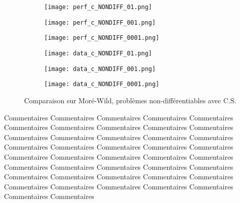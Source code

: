 \documentclass[letterpaper]{scrartcl}
\begin{document}
		\begin{figure}[!htb] %
			\begin{subfigure}{0.48\textwidth}
				\texttt{[image: perf\_c\_NONDIFF\_01.png]}
			\end{subfigure}\hspace*{\fill}
			\begin{subfigure}{0.48\textwidth}
				\texttt{[image: perf\_c\_NONDIFF\_001.png]}
			\end{subfigure}
			\medskip
			\begin{subfigure}{0.48\textwidth}
				\texttt{[image: perf\_c\_NONDIFF\_0001.png]}
			\end{subfigure}\hspace*{\fill}
			\begin{subfigure}{0.48\textwidth}
				\texttt{[image: data\_c\_NONDIFF\_01.png]}
			\end{subfigure}
			\medskip
			\begin{subfigure}{0.48\textwidth}
				\texttt{[image: data\_c\_NONDIFF\_001.png]}
			\end{subfigure}\hspace*{\fill}
			\begin{subfigure}{0.48\textwidth}
				\texttt{[image: data\_c\_NONDIFF\_0001.png]}
			\end{subfigure}
			\caption{Comparaison sur Moré-Wild, problèmes non-différentiables avec C.S.} \label{fig:2}
		\end{figure}
		\clearpage
		Commentaires Commentaires Commentaires Commentaires Commentaires Commentaires Commentaires Commentaires Commentaires Commentaires Commentaires Commentaires Commentaires Commentaires Commentaires Commentaires Commentaires Commentaires Commentaires Commentaires Commentaires Commentaires Commentaires Commentaires Commentaires Commentaires Commentaires Commentaires Commentaires Commentaires Commentaires Commentaires Commentaires Commentaires Commentaires Commentaires Commentaires Commentaires Commentaires Commentaires Commentaires Commentaires  
		\clearpage
\end{document}
